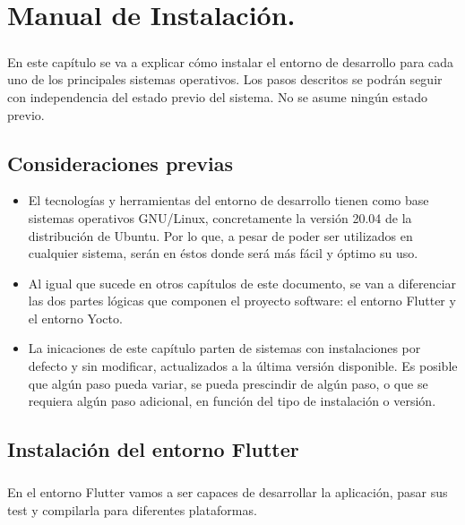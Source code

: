 \chapter{Manual de Instalación.}\label{sec:ManualDeInstalacion}

\paragraph{}En este capítulo se va a explicar cómo instalar el entorno de desarrollo
para cada uno de los principales sistemas operativos. Los pasos descritos se podrán
seguir con independencia del estado previo del sistema. No se asume ningún estado previo.

\section{Consideraciones previas}

\begin{itemize}
    \item El tecnologías y herramientas del entorno de desarrollo tienen como base
    sistemas operativos GNU/Linux, concretamente la versión 20.04 de la distribución
    de Ubuntu. Por lo que, a pesar de poder ser utilizados en cualquier sistema,
    serán en éstos donde será más fácil y óptimo su uso.

    \item Al igual que sucede en otros capítulos de este documento, se van a diferenciar
    las dos partes lógicas que componen el proyecto software: el entorno Flutter y el
    entorno Yocto.

    \item La inicaciones de este capítulo parten de sistemas con instalaciones por defecto
    y sin modificar, actualizados a la última versión disponible. Es posible que algún
    paso pueda variar, se pueda prescindir de algún paso, o que se requiera algún paso
    adicional, en función del tipo de instalación o versión.
\end{itemize}

\section{Instalación del entorno Flutter}\label{sec:entflutter}

\paragraph{}En el entorno Flutter vamos a ser capaces de desarrollar la aplicación,
pasar sus test y compilarla para diferentes plataformas.

